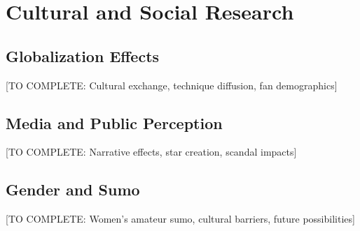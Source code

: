 \section{Cultural and Social Research}

\subsection{Globalization Effects}

[TO COMPLETE: Cultural exchange, technique diffusion, fan demographics]

\subsection{Media and Public Perception}

[TO COMPLETE: Narrative effects, star creation, scandal impacts]

\subsection{Gender and Sumo}

[TO COMPLETE: Women's amateur sumo, cultural barriers, future possibilities]